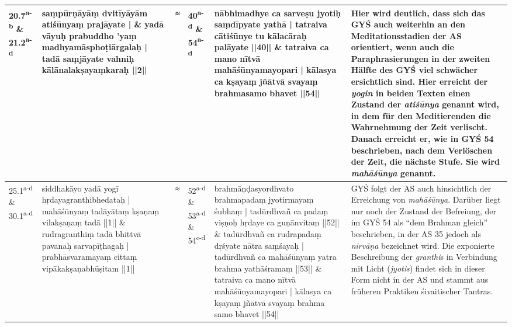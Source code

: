 \documentclass[a4paper,12pt]{article}
\begin{document}
{\begin{tabularx}{\textwidth}{p{}|p{}|p{}|p{}|p{}|p{}}
\hline
20.7\textsuperscript{a-b} \& 21.2\textsuperscript{a-d} & saṃpūrṇāyāṃ dvitīyāyām atiśūnyaṃ prajāyate | \newline \& \newline yadā vāyuḥ prabuddho 'yaṃ madhyamāsphoṭiārgalaḥ | tadā saṃjāyate vahniḥ kālānalakṣayaṃkaraḥ ||2|| & ≈ & 40\textsuperscript{a-d} \& 54\textsuperscript{a-d} & nābhimadhye ca sarveṣu jyotiḥ saṃdīpyate yathā | tatraiva cātiśūnye tu kālacāraḥ palāyate ||40|| \newline \& \newline tatraiva ca mano nītvā mahāśūnyamayopari | kālasya ca kṣayaṃ jñātvā svayaṃ brahmasamo bhavet ||54||  & Hier wird deutlich, dass sich das GYŚ auch weiterhin an den Meditationsstadien der AS orientiert, wenn auch die Paraphrasierungen in der zweiten Hälfte des GYŚ viel schwächer ersichtlich sind. Hier erreicht der \textit{yogin} in beiden Texten einen Zustand der \textit{atiśūnya} genannt wird, in dem für den Meditierenden die Wahrnehmung der Zeit verlischt. Danach erreicht er, wie in GYŚ 54 beschrieben, nach dem Verlöschen der Zeit, die nächste Stufe. Sie wird \textit{mahāśūnya} genannt. \\

\hline
25.1\textsuperscript{a-d} \& 30.1\textsuperscript{a-d} & siddhakāyo yadā yogī hṛdayagranthibhedataḥ | mahāśūnyaṃ tadāyātaṃ kṣaṇaṃ vilakṣaṇaṃ tadā ||1|| \newline \& \newline rudragranthiṃ tadā bhittvā pavanaḥ sarvapīṭhagaḥ | prabhāsvaramayaṃ cittaṃ vipākakṣaṇabhūṣitam ||1|| & ≈ & 52\textsuperscript{a-d} \& 53\textsuperscript{a-d} \& 54\textsuperscript{c-d} & brahmāṇḍasyordhvato brahmapadaṃ jyotirmayaṃ śubhaṃ | tadūrdhvañ ca padaṃ viṣṇoḥ hṛdaye ca guṇānvitaṃ ||52|| \newline \& \newline
 tadūrdhvañ ca rudrapadaṃ dṛśyate nātra saṃśayaḥ | tadūrdhvañ ca mahāśūnyaṃ yatra brahma yathāśramaṃ ||53|| \newline \& \newline tatraiva ca mano nītvā mahāśūnyamayopari | kālasya ca kṣayaṃ jñātvā svayaṃ brahma samo bhavet ||54|| & GYŚ folgt der AS auch hinsichtlich der Erreichung von \textit{mahāśūnya}. Darüber liegt nur noch der Zustand der Befreiung, der im GYŚ 54 als ``dem Brahman gleich'' beschrieben, in der AS 35 jedoch als \textit{nirvāṇa} bezeichnet wird. Die exponierte Beschreibung der \textit{granthi}s in Verbindung mit Licht (\textit{jyotis}) findet sich in dieser Form nicht in der AS und stammt aus früheren Praktiken śivaitischer Tantras.   \\


\end{tabularx}
}%
\end{document}
